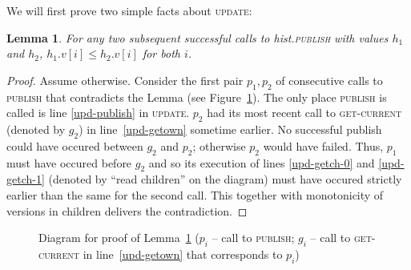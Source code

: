 \documentclass[a4paper,11pt]{article}
\newcommand{\atomic}[4]{\node(lab#1) at (#3,-#4+0.5) {#2};\draw (#3,-#4-0.1) to (lab#1);\node[inner sep=0pt](#1) at (#3,-#4) {};}
\newtheorem{lemma}{Lemma}
\newcommand{\fn}[1]{\textsc{#1}}
\begin{document}
We will first prove two simple facts about \fn{update}:

\begin{lemma}
\label{lem-versions-increase}
For any two subsequent successful calls to hist.\fn{publish} with values $h_1$ and $h_2$, $h_1.v[i] \leq h_2.v[i]$ for both $i$.
\end{lemma}
\begin{proof}
Assume otherwise. Consider the first pair $p_1, p_2$ of consecutive calls to \fn{publish} that contradicts the Lemma (see Figure~\ref{fig-versions-increase}). The only place \fn{publish} is called is line \ref{upd-publish}
in \fn{update}.
$p_2$ had its most recent call to \fn{get-current} (denoted by $g_2$) in line~\ref{upd-getown} sometime earlier. No successful publish could have occured between $g_2$ and $p_2$; otherwise $p_2$
would have failed.
Thus, $p_1$ must have occured before $g_2$ and so its execution of lines \ref{upd-getch-0} and \ref{upd-getch-1} (denoted by ``read children'' on the diagram) must have occured strictly earlier than
the same for the second call. This together with monotonicity of versions in children delivers the contradiction.
\end{proof}

\begin{figure}
\caption{Diagram for proof of Lemma~\ref{lem-versions-increase} ($p_i$ -- call to \fn{publish}; $g_i$ -- call to \fn{get-current} in line~\ref{upd-getown} that corresponds to $p_i$)}
\label{fig-versions-increase}
\end{figure}
\end{document}
